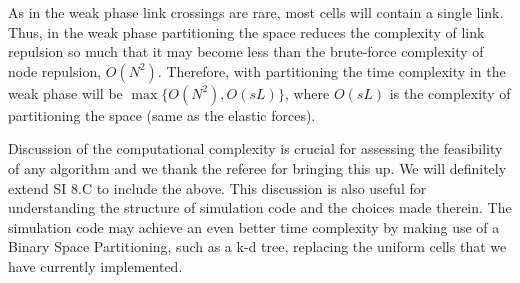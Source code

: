 \documentclass[11pt]{article}
\begin{document}
\begin{response}
As in the weak phase link crossings are rare, most cells will contain a single link.
Thus, in the weak phase partitioning the space reduces the complexity of link repulsion so much that it may become less than the brute-force complexity of node repulsion, $O(N^2)$.
Therefore,  with partitioning the time complexity in the weak phase will be $\max\{O(N^2),O(sL)\}$, where $O(sL)$ is the complexity of partitioning the space (same as the elastic forces).


Discussion of the computational complexity is crucial for assessing the feasibility of any algorithm and we thank the referee for bringing this up. 
We will definitely extend SI 8.C to include the above.
This discussion is also useful for understanding the structure of  simulation code and the choices made therein.
The simulation code may achieve an even better time complexity by making use of a Binary Space Partitioning, such as a k-d tree, replacing the uniform cells that we have currently implemented.


\end{response}
\end{document}
